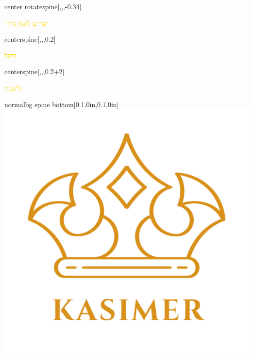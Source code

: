 \documentclass[
coverheight=8.5in,
coverwidth=5.5in,
spinewidth=.659in,
bleedwidth=.125in,
marklength=0in,
12pt,
pagecolor=black,
]{bookcover}
\newcommand{\hebtext}[1]{
\begin{hebrew}
	#1
\end{hebrew}
}
\begin{document}
	\begin{bookcover}
	\begin{bookcoverelement}{center rotate}{spine}[,,,-0.34\coverheight]
		\LARGE\textcolor{gold}{\hebtext{ישרים לשון סדור} }
	\end{bookcoverelement}
	\begin{bookcoverelement}{center}{spine}[,,,0.2\coverheight]
	\textcolor{gold}{\hebtext{לחול}}
	\end{bookcoverelement}
	\begin{bookcoverelement}{center}{spine}[,,,0.2\coverheight+2\baselineskip]
	\textcolor{gold}{\hebtext{ולשבת}}
	\end{bookcoverelement}
	\begin{bookcoverelement}{normal}{bg spine bottom}[0.1\spinewidth,0in,0.1\spinewidth,0in]
		\includegraphics[width=0.8\spinewidth,height=0.8\spinewidth]{kasimer_logo.png}
	\end{bookcoverelement}
		


\end{bookcover}
\end{document}
